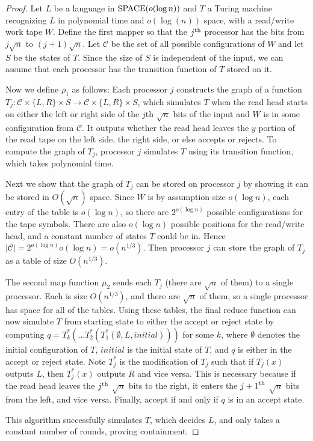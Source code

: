 \documentclass[11pt]{article}
\theoremstyle{definition}
\theoremstyle{remark}
\begin{document}
\begin{proof}
Let $L$ be a language in $\textup{SPACE}(o(\log n))$ and $T$ a Turing machine
recognizing $L$ in polynomial time and $o(\log(n))$ space, with a read/write
work tape $W$. Define the first mapper so that the $j^\textup{th}$ processor
has the bits from $j\sqrt{n}$ to $(j+1)\sqrt{n}$. Let $\mathcal{C}$ be the set
of all possible configurations of $W$ and let $S$ be the states of $T$. Since
the size of $S$ is independent of the input, we can assume that each processor
has the transition function of $T$ stored on it.

Now we define $\rho_1$ as follows: Each processor $j$ constructs the graph of a
function $T_j:\mathcal{C} \times \{L,R\} \times S \rightarrow \mathcal{C}
\times \{L,R\} \times S$, which simulates $T$ when the read head starts on
either the left or right side of the $j$th $\sqrt{n}$ bits of the input and $W$
is in some configuration from $\mathcal{C}$. It outputs whether the read head
leaves the $y$ portion of the read tape on the left side, the right side, or
else accepts or rejects. To compute the graph of $T_j$, processor $j$
simulates $T$ using its transition function, which takes polynomial time.

Next we show that the graph of $T_j$ can be stored on processor $j$ by showing
it can be stored in $O(\sqrt{n})$ space. Since $W$ is by assumption size
$o(\log n)$, each entry of the table is $o(\log n)$, so there are $2^{o(\log
n)}$ possible configurations for the tape symbols. There are also $o(\log n)$
possible positions for the read/write head, and a constant number of states $T$
could be in. Hence $|\mathcal{C}| = 2^{o(\log n)} o(\log n) = o(n^{1/3})$.
Then processor $j$ can store the graph of $T_j$ as a table of size
$O(n^{1/3})$.

The second map function $\mu_2$ sends each $T_j$ (there are $\sqrt{n}$ of them)
to a single processor. Each is size $O(n^{1/3})$, and there are $\sqrt{n}$ of
them, so a single processor has space for all of the tables. Using these
tables, the final reduce function can now simulate $T$ from starting state to
either the accept or reject state by computing $q=T_k^*(\ldots
T_2^*(T_1^*(\emptyset,L,initial)))$ for some $k$, where $\emptyset$ denotes the
initial configuration of $T$, $initial$ is the initial state of $T$, and $q$ is
either in the accept or reject state. Note $T_j^*$ is the modification of
$T_j$ such that if $T_j(x)$ outputs $L$, then $T_j^*(x)$ outputs $R$ and vice
versa. This is necessary because if the read head leaves the $j^\textup{th}$
$\sqrt{n}$ bits to the right, it enters the ${j+1}^\textup{th}$ $\sqrt{n}$ bits
from the left, and vice versa. Finally, accept if and only if $q$ is in an
accept state.

This algorithm successfully simulates $T$, which decides $L$, and only takes a
constant number of rounds, proving containment. \end{proof}
\end{document}
